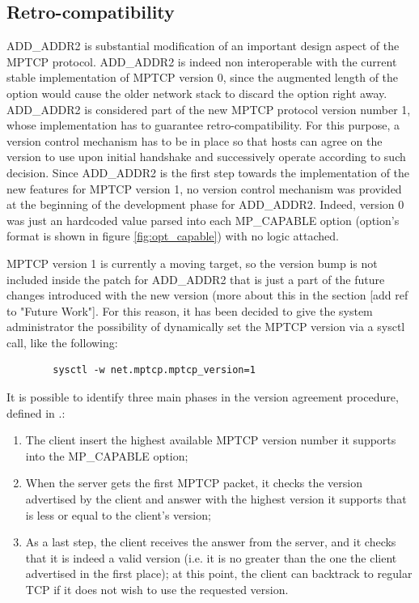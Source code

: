 
\subsection{Retro-compatibility}
\label{retrocomp}
ADD\_ADDR2 is substantial modification of an important design aspect of the MPTCP protocol. ADD\_ADDR2 is indeed non interoperable with the current stable implementation of MPTCP version 0, since the augmented length of the option would cause the older network stack to discard the option right away.
ADD\_ADDR2 is considered part of the new MPTCP protocol version number 1, whose implementation has to guarantee retro-compatibility. For this purpose, a version control mechanism has to be in place so that hosts can agree on the version to use upon initial handshake and successively operate according to such decision. Since ADD\_ADDR2 is the first step towards the implementation of the new features for MPTCP version 1, no version control mechanism was provided at the beginning of the development phase for ADD\_ADDR2. Indeed, version 0 was just an hardcoded value parsed into each MP\_CAPABLE option (option's format is shown in figure \ref{fig:opt_capable}) with no logic attached.


MPTCP version 1 is currently a moving target, so the version bump is not included inside the patch for ADD\_ADDR2 that is just a part of the future changes introduced with the new version (more about this in the section [add ref to "Future Work"]. For this reason, it has been decided to give the system administrator the possibility of dynamically set the MPTCP version via a sysctl call, like the following:

\begin{verbatim}
        sysctl -w net.mptcp.mptcp_version=1
\end{verbatim}

It is possible to identify three main phases in the version agreement procedure, defined in .:

\begin{enumerate}
  \item The client insert the highest available MPTCP version number it supports into the MP\_CAPABLE option;
  \item When the server gets the first MPTCP packet, it checks the version advertised by the client and answer with the highest version it supports that is less or equal to the client's version;
  \item As a last step, the client receives the answer from the server, and it checks that it is indeed a valid version (i.e. it is no greater than the one the client advertised in the first place); at this point, the client can backtrack to regular TCP if it does not wish to use the requested version.
\end{enumerate}

